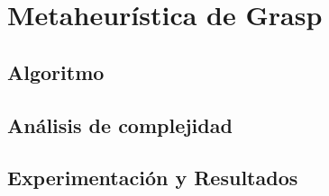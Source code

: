 \section{Metaheurística de Grasp}

\subsection{Algoritmo}

\subsection{Análisis de complejidad}

\subsection{Experimentación y Resultados}
